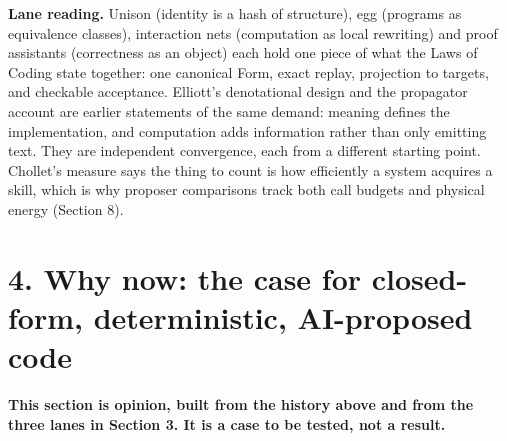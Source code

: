 \documentclass[10pt,letterpaper]{article}
\begin{document}
\textbf{Lane reading.} Unison (identity is a hash of structure), egg
(programs as equivalence classes), interaction nets (computation as
local rewriting) and proof assistants (correctness as an object) each
hold one piece of what the Laws of Coding state together: one canonical
Form, exact replay, projection to targets, and checkable acceptance.
Elliott's denotational design and the propagator account are earlier
statements of the same demand: meaning defines the implementation, and
computation adds information rather than only emitting text. They are
independent convergence, each from a different starting point. Chollet's
measure says the thing to count is how efficiently a system acquires a
skill, which is why proposer comparisons track both call budgets and
physical energy (Section 8).

\section{4. Why now: the case for closed-form, deterministic,
AI-proposed
code}\label{why-now-the-case-for-closed-form-deterministic-ai-proposed-code}

\textbf{This section is opinion, built from the history above and from
the three lanes in Section 3. It is a case to be tested, not a result.}
\end{document}
